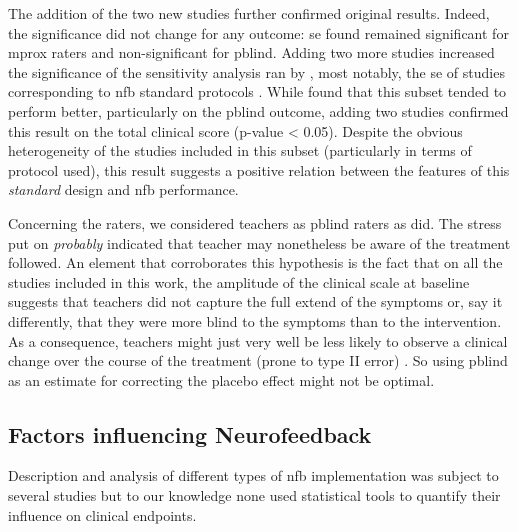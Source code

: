 The addition of the two new studies \citep{Strehl2017, Baumeister2016} further confirmed original results. Indeed, the
significance did not change for any outcome: \gls{se} found remained significant for \gls{mprox} raters and
non-significant for \gls{pblind}.  Adding two more studies increased the significance of the sensitivity analysis ran by
\citeauthor{Cortese2016}, most notably, the \gls{se} of studies corresponding to \gls{nfb} standard protocols \citet{Arns2014}. While \citeauthor{Cortese2016} found that this subset tended to perform better, particularly on the \gls{pblind} outcome, adding two studies confirmed this result on the total clinical score (p-value < 0.05).  Despite the obvious heterogeneity of the studies included in this subset (particularly in terms of protocol used), this result
suggests a positive relation between the features of this \emph{standard} design and \gls{nfb} performance.

Concerning the raters, we considered teachers as \gls{pblind} raters as
\citeauthor{Cortese2016,Micoulaud2014} did. The stress put on \emph{probably} indicated that teacher may nonetheless be
aware of the treatment followed. An element that corroborates this hypothesis is the fact that on all the studies
included in this work, the amplitude of the clinical scale at baseline suggests that teachers did not capture the full
extend of the symptoms or, say it differently, that they were more blind to the symptoms than to the intervention. 
As a consequence, teachers might just very well be less likely to observe a clinical change over the course of the
treatment (prone to type II error) \citep{Sollie2013, Narad2015,
  Minder2018}. So using \gls{pblind} as an estimate for correcting the placebo effect might not be optimal.


\subsection{Factors influencing Neurofeedback}

Description and analysis of different types of \gls{nfb} implementation was subject to several studies \citep{Arns2014,
  Enriquez2017, Vernon2004, Jeunet2018} but to our knowledge none used statistical tools to quantify their influence on
clinical endpoints. 

